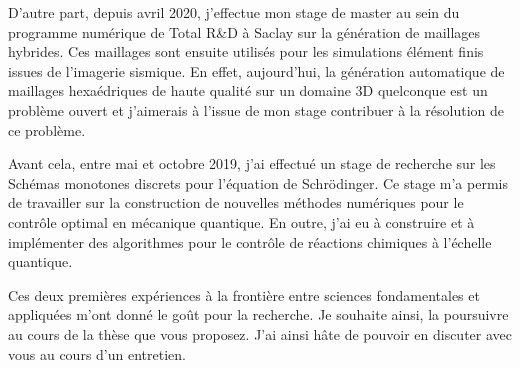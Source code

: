 \documentclass[11pt,a4paper,sans]{moderncv}        %
\begin{document}
D'autre part, depuis avril 2020, j'effectue mon stage de master au sein du programme numérique de Total R\&D à Saclay sur la génération de maillages hybrides. Ces maillages sont ensuite utilisés pour les simulations élément finis issues de l'imagerie sismique. En effet, aujourd'hui, la génération automatique de maillages hexaédriques de haute qualité sur un domaine 3D quelconque est un problème ouvert et j'aimerais à l'issue de mon stage contribuer à la résolution de ce problème.

Avant cela, entre mai et octobre 2019, j’ai effectué un stage de recherche sur les Schémas monotones discrets pour l'équation de Schrödinger. Ce stage m'a permis de travailler sur la construction de nouvelles méthodes numériques pour le contrôle optimal en mécanique quantique. En outre, j’ai eu à construire et à implémenter des algorithmes pour le contrôle de réactions chimiques à l'échelle quantique.



Ces deux premières expériences à la frontière entre sciences fondamentales et appliquées m’ont donné le goût pour la recherche. Je souhaite ainsi, la poursuivre au cours de la thèse que vous proposez. J’ai ainsi hâte de pouvoir en discuter avec vous au cours d'un entretien.




\makeletterclosing
\end{document}
